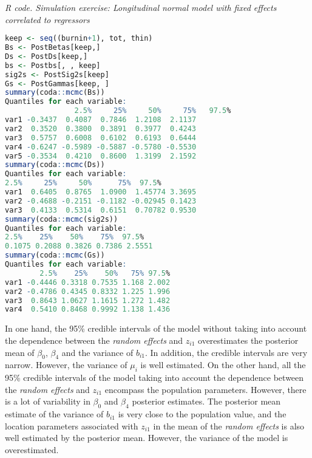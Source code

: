 \begin{enumerate}[leftmargin=*]
\begin{tcolorbox}[enhanced,width=4.67in,center upper,
	fontupper=\large\bfseries,drop shadow southwest,sharp corners]
	\textit{R code. Simulation exercise: Longitudinal normal model with fixed effects correlated to regressors}
	\begin{VF}
		\begin{lstlisting}[language=R]
keep <- seq((burnin+1), tot, thin)
Bs <- PostBetas[keep,]
Ds <- PostDs[keep,]
bs <- Postbs[, , keep]
sig2s <- PostSig2s[keep]
Gs <- PostGammas[keep, ]
summary(coda::mcmc(Bs))
Quantiles for each variable:
				2.5%     25%     50%     75%   97.5%
var1 -0.3437  0.4087  0.7846  1.2108  2.1137
var2  0.3520  0.3800  0.3891  0.3977  0.4243
var3  0.5757  0.6008  0.6102  0.6193  0.6444
var4 -0.6247 -0.5989 -0.5887 -0.5780 -0.5530
var5 -0.3534  0.4210  0.8600  1.3199  2.1592
summary(coda::mcmc(Ds))
Quantiles for each variable:
2.5%     25%     50%      75%  97.5%
var1  0.6405  0.8765  1.0900  1.45774 3.3695
var2 -0.4688 -0.2151 -0.1182 -0.02945 0.1423
var3  0.4133  0.5314  0.6151  0.70782 0.9530
summary(coda::mcmc(sig2s))
Quantiles for each variable:
2.5%    25%    50%    75%  97.5% 
0.1075 0.2088 0.3826 0.7386 2.5551 
summary(coda::mcmc(Gs))
Quantiles for each variable:
        2.5%    25%    50%   75% 97.5%
var1 -0.4446 0.3318 0.7535 1.168 2.002
var2 -0.4786 0.4345 0.8332 1.225 1.996
var3  0.8643 1.0627 1.1615 1.272 1.482
var4  0.5410 0.8468 0.9992 1.138 1.436
\end{lstlisting}
	\end{VF}
\end{tcolorbox}
In one hand, the 95\% credible intervals of the model without taking into account the dependence between the \textit{random effects} and $z_{i1}$ overestimates the posterior mean of $\beta_0$, $\beta_4$ and the variance of $b_{i1}$. In addition, the credible intervals are very narrow. However, the variance of $\mu_i$ is well estimated. On the other hand, all the 95\% credible intervals of the model taking into account the dependence between the \textit{random effects} and $z_{i1}$ encompass the population parameters. However, there is a lot of variability in $\beta_0$ and $\beta_4$ posterior estimates. The posterior mean estimate of the variance of $b_{i1}$ is very close to the population value, and the location parameters associated with $z_{i1}$ in the mean of the \textit{random effects} is also well estimated by the posterior mean. However, the variance of the model is overestimated.  

\end{enumerate}